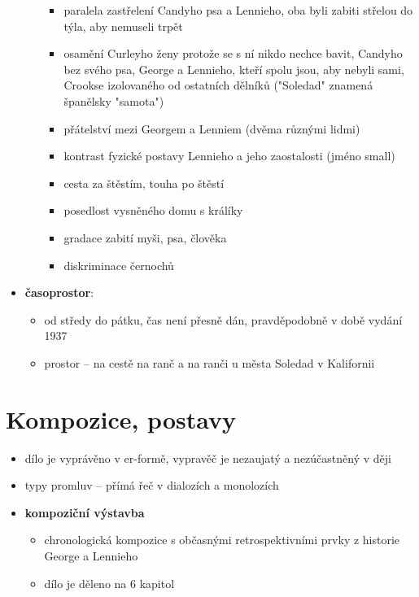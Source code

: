 \documentclass[10pt,a4paper]{article}
\begin{document}
\begin{itemize}
\begin{itemize}
		\begin{itemize}
		\item paralela zastřelení Candyho psa a Lennieho, oba byli zabiti střelou do týla, aby nemuseli trpět
		\item osamění Curleyho ženy protože se s ní nikdo nechce bavit, Candyho bez svého psa, George a Lennieho, kteří spolu jsou, aby nebyli sami, Crookse izolovaného od ostatních dělníků ("Soledad" znamená španělsky "samota")
		\item přátelství mezi Georgem a Lenniem (dvěma různými lidmi)
		\item kontrast fyzické postavy Lennieho a jeho zaostalosti (jméno small)
		\item cesta za štěstím, touha po štěstí
		\item posedlost vysněného domu s králíky
		\item gradace zabití myši, psa, člověka
		\item diskriminace černochů
		\end{itemize}
	\end{itemize}
\item \textbf{časoprostor}: 
	\begin{itemize}
	\item od středy do pátku, čas není přesně dán, pravděpodobně v době vydání 1937
	\item prostor -- na cestě na ranč a na ranči u města Soledad v Kalifornii
	\end{itemize}

\end{itemize}
\section*{Kompozice, postavy}
\begin{itemize}
\item dílo je vyprávěno v er-formě, vypravěč je nezaujatý a nezúčastněný v ději
\item typy promluv -- přímá řeč v dialozích a monolozích
\item \textbf{kompoziční výstavba}
	\begin{itemize}
	\item chronologická kompozice s občasnými retrospektivními prvky z historie George a Lennieho 
	\item dílo je děleno na 6 kapitol
	\end{itemize}
\end{itemize}
\end{document}
